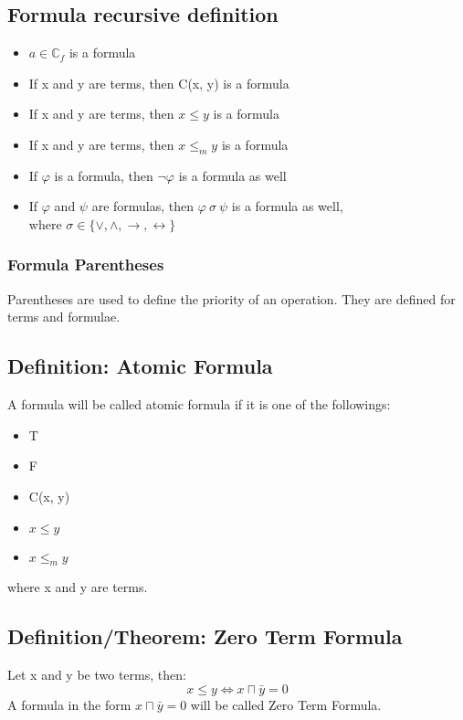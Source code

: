 \documentclass{article}
\begin{document}
	\subsection{Formula recursive definition}
	\begin{itemize}
		\item $a \in \mathbb{C}_f$ is a formula
		\item If x and y are terms, then C(x, y) is a formula
		\item If x and y are terms, then $x \le y$ is a formula
		\item If x and y are terms, then $x \le_m y$ is a formula
		\item If $\varphi$ is a formula, then $\neg \varphi$ is a formula as well
		\item If $\varphi$ and $\psi$ are formulas, then $\varphi \: \sigma \: \psi $ is a formula as well,\\
			where $\sigma \in \{\vee, \wedge, \rightarrow, \leftrightarrow\}$
	\end{itemize}

	\subsubsection*{Formula Parentheses}
		Parentheses are used to define the priority of an operation. They are defined for terms and formulae.
	
	\subsection{Definition: Atomic Formula}
		A formula will be called atomic formula if it is one of the followings:
		\begin{itemize}
			\item T
			\item F
			\item C(x, y)
			\item $x \le y$
			\item $x \le_m y$
		\end{itemize}
		where x and y are terms.
	
	\subsection{Definition/Theorem: Zero Term Formula}
		Let x and y be two terms, then:
		\begin{equation}
			x \le y  \iff x \sqcap \bar{y} = 0
		\end{equation}
		A formula in the form $x \sqcap \bar{y} = 0$ will be called Zero Term Formula.
\end{document}
